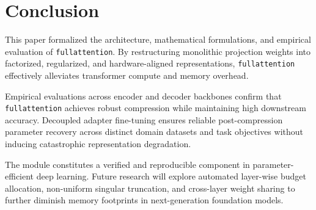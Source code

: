 \section{Conclusion}
This paper formalized the architecture, mathematical formulations, and empirical evaluation of \texttt{fullattention}. By restructuring monolithic projection weights into factorized, regularized, and hardware-aligned representations, \texttt{fullattention} effectively alleviates transformer compute and memory overhead.

Empirical evaluations across encoder and decoder backbones confirm that \texttt{fullattention} achieves robust compression while maintaining high downstream accuracy. Decoupled adapter fine-tuning ensures reliable post-compression parameter recovery across distinct domain datasets and task objectives without inducing catastrophic representation degradation.

The module constitutes a verified and reproducible component in parameter-efficient deep learning. Future research will explore automated layer-wise budget allocation, non-uniform singular truncation, and cross-layer weight sharing to further diminish memory footprints in next-generation foundation models.
